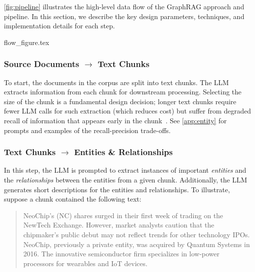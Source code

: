 \documentclass{article}
\begin{document}
\autoref{fig:pipeline} illustrates the high-level data flow of the GraphRAG approach  and pipeline.
In this section, we describe the key design parameters, techniques, and implementation details for each step.

{flow_figure.tex}

\subsubsection{Source Documents \texorpdfstring{\texorpdfstring{$\rightarrow$}{-->}}{-->} Text Chunks}

To start, the documents in the corpus are split into text chunks.
The LLM extracts information from each chunk for downstream processing.
Selecting the size of the chunk is a fundamental design decision; longer text chunks require fewer LLM calls for such extraction (which reduces cost) but suffer from degraded recall of information that appears early in the chunk~\citep{liu-etal:2023:tacl, kuratov2024search}.
See \autoref{app:entity} for prompts and examples of the recall-precision trade-offs.

\subsubsection{Text Chunks \texorpdfstring{$\rightarrow$}{-->} Entities \& Relationships}

In this step, the LLM is prompted to extract instances of important \emph{entities} and the \emph{relationships} between the entities from a given chunk. 
Additionally, the LLM generates short descriptions for the entities and relationships. To illustrate, suppose a chunk contained the following text:

\begin{quote}
NeoChip's (NC) shares surged in their first week of trading on the NewTech Exchange.
However, market analysts caution that the chipmaker's public debut may not reflect trends for other technology IPOs.
NeoChip, previously a private entity, was acquired by Quantum Systems in 2016.
The innovative semiconductor firm specializes in low-power processors for wearables and IoT devices.
\end{quote}
\end{document}
